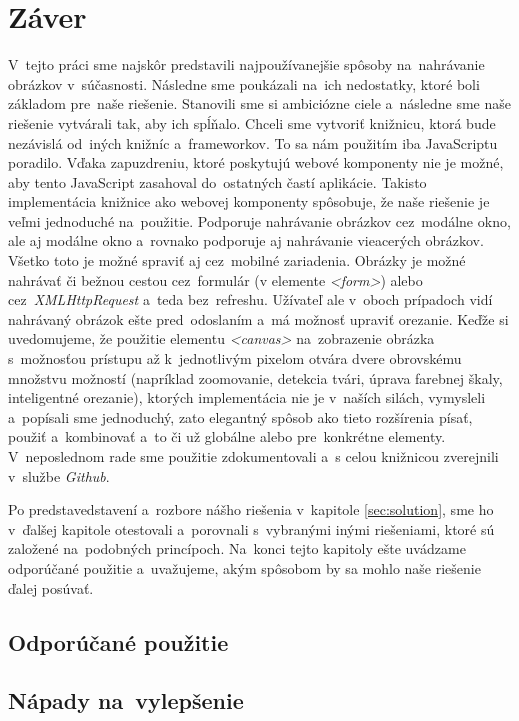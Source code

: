 \chapter{Záver}
V~tejto práci sme najskôr predstavili najpoužívanejšie spôsoby na~nahrávanie obrázkov v~súčasnosti. Následne sme poukázali na~ich nedostatky, ktoré boli základom pre~naše riešenie. Stanovili sme si ambiciózne ciele a~následne sme naše riešenie vytvárali tak, aby ich spĺňalo.
Chceli sme vytvoriť knižnicu, ktorá bude nezávislá od~iných knižníc a~frameworkov. To sa nám použitím iba JavaScriptu poradilo. Vďaka zapuzdreniu, ktoré poskytujú webové komponenty nie je možné, aby tento JavaScript zasahoval do~ostatných častí aplikácie. Takisto implementácia knižnice ako webovej komponenty spôsobuje, že naše riešenie je veľmi jednoduché na~použitie.
Podporuje nahrávanie obrázkov cez~modálne okno, ale aj modálne okno a~rovnako podporuje aj nahrávanie vieacerých obrázkov. Všetko toto je možné spraviť aj cez~mobilné zariadenia. Obrázky je možné nahrávať či bežnou cestou cez~formulár (v elemente \emph{<form>}) alebo cez~\emph{XMLHttpRequest} a~teda bez~refreshu. Užívateľ ale v~oboch prípadoch vidí nahrávaný obrázok ešte pred~odoslaním a~má možnosť upraviť orezanie.
Keďže si uvedomujeme, že použitie elementu \emph{<canvas>} na~zobrazenie obrázka s~možnosťou prístupu až k~jednotlivým pixelom otvára dvere obrovskému množstvu možností (napríklad zoomovanie, detekcia tvári, úprava farebnej škaly, inteligentné orezanie), ktorých implementácia nie je v~naších silách, vymysleli a~popísali sme jednoduchý, zato elegantný spôsob ako tieto rozšírenia písať, použiť a~kombinovať a~to či už globálne alebo pre~konkrétne elementy. V~neposlednom rade sme použitie zdokumentovali a~s celou knižnicou zverejnili v~službe \emph{Github}.

Po predstavedstavení a~rozbore nášho riešenia v~kapitole \ref{sec:solution}, sme ho v~ďalšej kapitole otestovali a~porovnali s~vybranými inými riešeniami, ktoré sú založené na~podobných princípoch. Na~konci tejto kapitoly ešte uvádzame odporúčané použitie a~uvažujeme, akým spôsobom by sa mohlo naše riešenie ďalej posúvať. 

\section{Odporúčané použitie}
\section{Nápady na~vylepšenie}